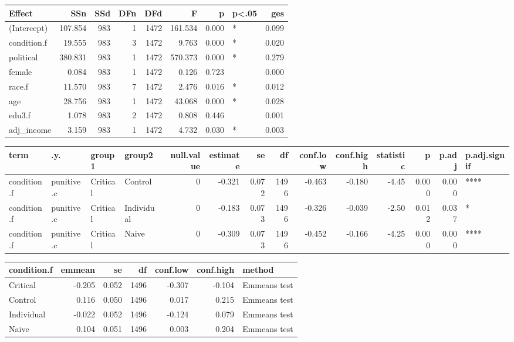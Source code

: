\documentclass[
]{book}
\begin{document}
\begin{tabular}{l|r|r|r|r|r|r|l|r}
\hline
Effect & SSn & SSd & DFn & DFd & F & p & p<.05 & ges\\
\hline
(Intercept) & 107.854 & 983 & 1 & 1472 & 161.534 & 0.000 & * & 0.099\\
\hline
condition.f & 19.555 & 983 & 3 & 1472 & 9.763 & 0.000 & * & 0.020\\
\hline
political & 380.831 & 983 & 1 & 1472 & 570.373 & 0.000 & * & 0.279\\
\hline
female & 0.084 & 983 & 1 & 1472 & 0.126 & 0.723 &  & 0.000\\
\hline
race.f & 11.570 & 983 & 7 & 1472 & 2.476 & 0.016 & * & 0.012\\
\hline
age & 28.756 & 983 & 1 & 1472 & 43.068 & 0.000 & * & 0.028\\
\hline
edu3.f & 1.078 & 983 & 2 & 1472 & 0.808 & 0.446 &  & 0.001\\
\hline
adj\_income & 3.159 & 983 & 1 & 1472 & 4.732 & 0.030 & * & 0.003\\
\hline
\end{tabular}

\begin{tabular}{l|l|l|l|r|r|r|r|r|r|r|r|r|l}
\hline
term & .y. & group1 & group2 & null.value & estimate & se & df & conf.low & conf.high & statistic & p & p.adj & p.adj.signif\\
\hline
condition.f & punitive.c & Critical & Control & 0 & -0.321 & 0.072 & 1496 & -0.463 & -0.180 & -4.45 & 0.000 & 0.000 & ****\\
\hline
condition.f & punitive.c & Critical & Individual & 0 & -0.183 & 0.073 & 1496 & -0.326 & -0.039 & -2.50 & 0.012 & 0.037 & *\\
\hline
condition.f & punitive.c & Critical & Naive & 0 & -0.309 & 0.073 & 1496 & -0.452 & -0.166 & -4.25 & 0.000 & 0.000 & ****\\
\hline
\end{tabular}

\begin{tabular}{l|r|r|r|r|r|l}
\hline
condition.f & emmean & se & df & conf.low & conf.high & method\\
\hline
Critical & -0.205 & 0.052 & 1496 & -0.307 & -0.104 & Emmeans test\\
\hline
Control & 0.116 & 0.050 & 1496 & 0.017 & 0.215 & Emmeans test\\
\hline
Individual & -0.022 & 0.052 & 1496 & -0.124 & 0.079 & Emmeans test\\
\hline
Naive & 0.104 & 0.051 & 1496 & 0.003 & 0.204 & Emmeans test\\
\hline
\end{tabular}
\end{document}
